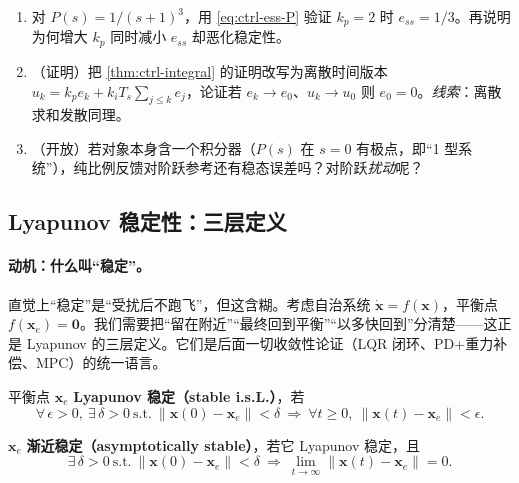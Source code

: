 \begin{practice}
\begin{enumerate}
  \item 对 $P(s)=1/(s+1)^3$，用 \cref{eq:ctrl-ess-P} 验证 $k_p=2$ 时 $e_{ss}=1/3$。再说明为何增大 $k_p$ 同时减小 $e_{ss}$ 却恶化稳定性。
  \item （证明）把 \cref{thm:ctrl-integral} 的证明改写为离散时间版本 $u_k=k_pe_k+k_iT_s\sum_{j\le k}e_j$，论证若 $e_k\to e_0$、$u_k\to u_0$ 则 $e_0=0$。\emph{线索}：离散求和发散同理。
  \item （开放）若对象本身含一个积分器（$P(s)$ 在 $s=0$ 有极点，即“1 型系统”），纯比例反馈对阶跃参考还有稳态误差吗？对阶跃\emph{扰动}呢？
\end{enumerate}
\end{practice}

\subsection{Lyapunov 稳定性：三层定义}
\label{sec:ctrl-lyapunov}

\paragraph{动机：什么叫“稳定”。}
直觉上“稳定”是“受扰后不跑飞”，但这含糊。考虑自治系统 $\dot{\mathbf{x}}=f(\mathbf{x})$，平衡点 $f(\mathbf{x}_e)=\mathbf{0}$。我们需要把“留在附近”“最终回到平衡”“以多快回到”分清楚——这正是 Lyapunov 的三层定义\cite{khalil2002nonlinear}。它们是后面一切收敛性论证（LQR 闭环、PD+重力补偿、MPC）的统一语言。

\begin{definition}[Lyapunov 稳定]
\label{def:ctrl-lyap-stable}
平衡点 $\mathbf{x}_e$ \textbf{Lyapunov 稳定（stable i.s.L.）}，若
\begin{equation}
  \forall\,\epsilon>0,\ \exists\,\delta>0\ \text{s.t.}\ \|\mathbf{x}(0)-\mathbf{x}_e\|<\delta\ \Rightarrow\ \forall t\ge0,\ \|\mathbf{x}(t)-\mathbf{x}_e\|<\epsilon.
  \label{eq:ctrl-lyap-stable}
\end{equation}
\end{definition}

\begin{definition}[渐近稳定]
\label{def:ctrl-asymp-stable}
$\mathbf{x}_e$ \textbf{渐近稳定（asymptotically stable）}，若它 Lyapunov 稳定，且
\begin{equation}
  \exists\,\delta>0\ \text{s.t.}\ \|\mathbf{x}(0)-\mathbf{x}_e\|<\delta\ \Rightarrow\ \lim_{t\to\infty}\|\mathbf{x}(t)-\mathbf{x}_e\|=0.
\end{equation}
\end{definition}

